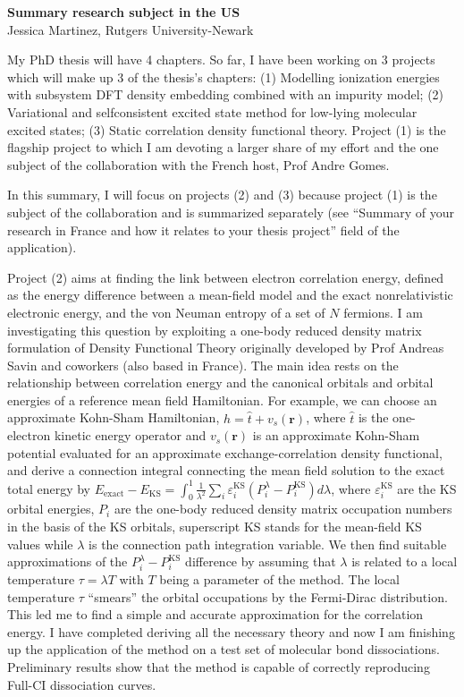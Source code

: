 \documentclass[notitlepage,12pt]{report}
\def\br{{\mathbf{r}}}
\begin{document}
\thispagestyle{empty}
\begin{center}
    \textbf{Summary research subject in the US}\\
    Jessica Martinez, Rutgers University-Newark
\end{center}

My PhD thesis will have 4 chapters. So far, I have been working on 3 projects which will make up 3 of the thesis's chapters: (1) Modelling ionization energies with subsystem DFT density embedding combined with an impurity model; (2) Variational and selfconsistent excited state method for low-lying molecular excited states; (3) Static correlation density functional theory. Project (1) is the flagship project to which I am devoting a larger share of my effort and the one subject of the collaboration with the French host, Prof Andre Gomes.

In this summary, I will focus on projects (2) and (3) because project (1) is the subject of the collaboration and is summarized separately (see ``Summary of your research in France and how it relates to your thesis project'' field of the application).

Project (2) aims at finding the link between electron correlation energy, defined as the energy difference between a mean-field model and the exact nonrelativistic electronic energy, and the von Neuman entropy of a set of $N$ fermions. I am investigating this question by exploiting a one-body reduced density matrix formulation of Density Functional Theory originally developed by Prof Andreas Savin and coworkers (also based in France). The main idea rests on the relationship between correlation energy and the canonical orbitals and orbital energies of a reference mean field Hamiltonian. For example, we can choose an approximate Kohn-Sham Hamiltonian, $\hat h = \hat t + v_s(\br)$, where $\hat t$ is the one-electron kinetic energy operator and $v_s(\br)$ is an approximate Kohn-Sham potential evaluated for an approximate exchange-correlation density functional, and derive a connection integral connecting the mean field solution to the exact total energy by $E_\text{exact}-E_\text{KS} = \int_0^1 \frac{1}{\lambda^2} \sum_i \varepsilon_i^\text{KS} \left( P_i^\lambda - P_i^\text{KS} \right)  d\lambda$, where $\varepsilon_i^\text{KS}$ are the KS orbital energies, $P_i$ are the one-body reduced density matrix occupation numbers in the basis of the KS orbitals, superscript KS stands for the mean-field KS values while $\lambda$ is the connection path integration variable. We then find suitable approximations of the $P_i^\lambda - P_i^\text{KS}$ difference by assuming that $\lambda$ is related to a local temperature $\tau=\lambda T$ with $T$ being a parameter of the method. The local temperature $\tau$ ``smears'' the orbital occupations by the Fermi-Dirac distribution. This led me to find a simple and accurate approximation for the correlation energy. I have completed deriving all the necessary theory and now I am finishing up the application of the method on a test set of molecular bond dissociations. Preliminary results show that the method is capable of correctly reproducing Full-CI dissociation curves.
\end{document}
